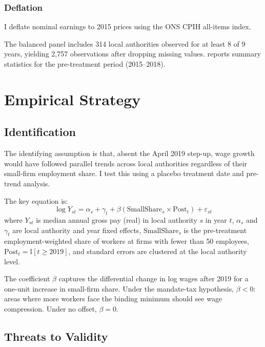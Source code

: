 \documentclass[12pt]{article}
\newcommand{\ind}{\mathbb{I}}
\begin{document}
\subsubsection*{Deflation} I deflate nominal earnings to 2015 prices using the ONS CPIH all-items index.

The balanced panel includes 314 local authorities observed for at least 8 of 9 years, yielding 2,757 observations after dropping missing values.  reports summary statistics for the pre-treatment period (2015--2018).




\section{Empirical Strategy}
\label{sec:strategy}

\subsection{Identification}

The identifying assumption is that, absent the April 2019 step-up, wage growth would have followed parallel trends across local authorities regardless of their small-firm employment share. I test this using a placebo treatment date and pre-trend analysis.

The key equation is:
\begin{equation}
\log Y_{st} = \alpha_s + \gamma_t + \beta \left(\text{SmallShare}_s \times \text{Post}_t\right) + \varepsilon_{st}
\label{eq:did}
\end{equation}
where $Y_{st}$ is median annual gross pay (real) in local authority $s$ in year $t$, $\alpha_s$ and $\gamma_t$ are local authority and year fixed effects, $\text{SmallShare}_s$ is the pre-treatment employment-weighted share of workers at firms with fewer than 50 employees, $\text{Post}_t = \ind[t \geq 2019]$, and standard errors are clustered at the local authority level.

The coefficient $\beta$ captures the differential change in log wages after 2019 for a one-unit increase in small-firm share. Under the mandate-tax hypothesis, $\beta < 0$: areas where more workers face the binding minimum should see wage compression. Under no offset, $\beta = 0$.

\subsection{Threats to Validity}
\end{document}
